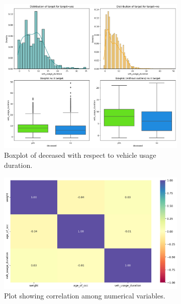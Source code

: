 \documentclass[12pt,a4paper]{article}
\begin{document}
	\begin{figure}[h]
		\centering
		\begin{subfigure}[t]{0.495\linewidth}
			\centering
			\includegraphics[width=\linewidth]{veh_usage_dur_wrt_target.png}
			\caption{Boxplot of deceased with respect to vehicle usage duration.}
			\label{fig:veh_usage_dur_wrt_target.png}
		\end{subfigure}
		\hfill
		\begin{subfigure}[t]{0.495\linewidth}
			\centering
			\includegraphics[width=\linewidth]{corr.png}
			\caption{Plot showing correlation among numerical variables.}
			\label{fig:corrt}
		\end{subfigure}
		\caption{}
		\label{fig:veh_usage_dur_wrt_target and corr }
	\end{figure}
	
\end{document}
